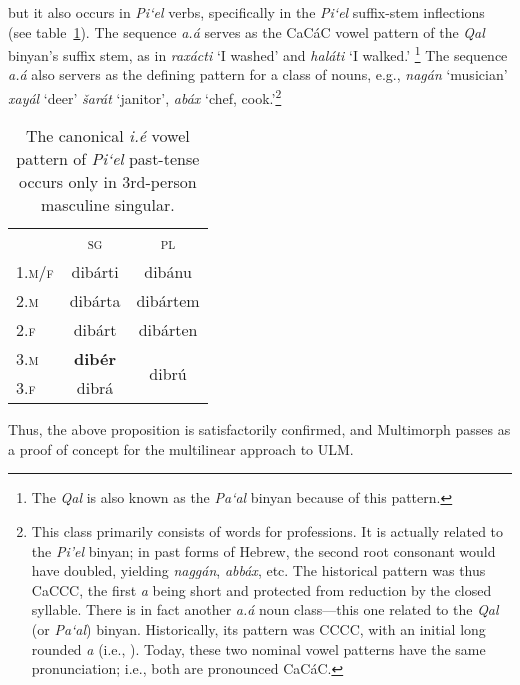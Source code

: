  but it also occurs in \textit{Pi`{e}l} verbs, specifically in the \textit{Pi`{e}l} suffix-stem inflections (see table~\ref{tab:piel-paradigm}).
The sequence \textit{a.\'{a}} serves as the CaC\'{a}C vowel pattern of the \textit{Qal} 
binyan's suffix stem, as in \textit{rax\'{a}cti} `I washed' and \textit{hal\'{a}ti} `I walked.'
\footnote{The \textit{Qal} is also known as the \textit{\textit{Pa`al}} binyan because
of this pattern.}
The sequence \textit{a.\'{a}} also servers as the defining pattern for a class of nouns, e.g., \textit{nag\'{a}n} `musician'  \textit{xay\'{a}l} `deer' \textit{\v{s}ar\'{a}t} `janitor', \textit{ab\'{a}x} `chef, cook.'\footnote{This class primarily consists of words for professions. It is actually related to the \textit{Pi'el} binyan; in past forms of Hebrew, the second root consonant would have doubled, yielding \textit{nagg\'{a}n}, \textit{abb\'{a}x}, etc. The historical pattern was thus CaCCC, the first \textit{a} being short and protected from reduction by the closed syllable.   There is in fact another \textit{a.\'{a}} noun class---this one related to the \textit{Qal} (or \textit{Pa`al}) binyan. Historically, its pattern was CCCC, with an initial long rounded \textit{a} (i.e., ). Today, these two nominal vowel patterns have the same pronunciation; i.e., both are pronounced CaC\'{a}C.}

\begin{table}[t]
\centering
\setlength{\extrarowheight}{6pt}
\begin{tabular}{lcc}
\toprule
& \textsc{sg} & \textsc{pl} \\
\cmidrule{2-3}
\textsc{1.m/f} & dib\'{a}rti &  dib\'{a}nu \\
\textsc{2.m} & dib\'{a}rta & dib\'{a}rtem \\
\textsc{2.f} & dib\'{a}rt & dib\'{a}rten \\
\textsc{3.m} & \textbf{dib\'{e}r} & \multirow{2}{*}{dibr\'{u}} \\
\textsc{3.f} &  dibr\'{a} &  \\
 \bottomrule
\end{tabular}
\label{tab:piel-paradigm}
\caption{The canonical \textit{i.\'e} vowel pattern of \textit{Pi`el} past-tense occurs only in 3rd-person masculine singular.}
\end{table}

Thus, the above proposition is satisfactorily confirmed, and Multimorph passes as a proof of concept for the multilinear approach to ULM.

